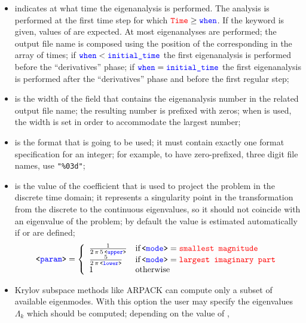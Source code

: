 \begin{itemize}
\item {} indicates at what time the eigenanalysis is performed.
	The analysis is performed at the first time step for which
	$\textcolor{red}{\texttt{Time}} \ge \textcolor{blue}{\texttt{when}}$.
	If the keyword  is given,  values
	of  are expected.  At most  eigenanalyses
	are performed; the output file name is composed using
	the position of the corresponding  in the array
	of times;
	if $\textcolor{blue}{\texttt{when}} < \textcolor{blue}{\texttt{initial\_time}}$ the first eigenanalysis
	is performed before the ``derivatives'' phase;
	if $\textcolor{blue}{\texttt{when}} = \textcolor{blue}{\texttt{initial\_time}}$ the first eigenanalysis
	is performed after the ``derivatives'' phase
	and before the first regular step;
\item {} is the width of the field that contains the eigenanalysis number
	in the related output file name; the resulting number is prefixed with zeros;
	when  is used, the width is set in order to accommodate
	the largest number;
\item {} is the format that is going to be used; it must contain exactly one
	format specification for an integer; for example, to have zero-prefixed, three digit
	file names, use \texttt{"\%03d"};
\item {} is the value of the coefficient that is used to project
	the problem in the discrete time domain; it represents
	a singularity point in the transformation from the discrete
	to the continuous eigenvalues, so it should not coincide with
	an eigenvalue of the problem; by default the value is estimated
        automatically if  or  are defined;
        \begin{align}
          \texttt{<\textcolor{blue}{param}>} = \left\{
          \begin{array}{ll}
            \frac{1}{2\,\pi\,5\,\texttt{<\textcolor{blue}{upper}>}} & \text{if} \, \texttt{<\textcolor{blue}{mode}>} = \textcolor{red}{\texttt{smallest magnitude}} \nonumber \\
            \frac{5}{2\,\pi\,\texttt{<\textcolor{blue}{lower}>}} & \text{if} \, \texttt{<\textcolor{blue}{mode}>} = \textcolor{red}{\texttt{largest imaginary part}} \nonumber \\
            1 & \text{otherwise} \nonumber
          \end{array}\right.
        \end{align}        
\item {} Krylov subspace methods like ARPACK can compute only a subset of
        available eigenmodes. With this option the user may specify the eigenvalues
        $\Lambda_k$ which should be computed; depending on the value of ,

\end{itemize}
